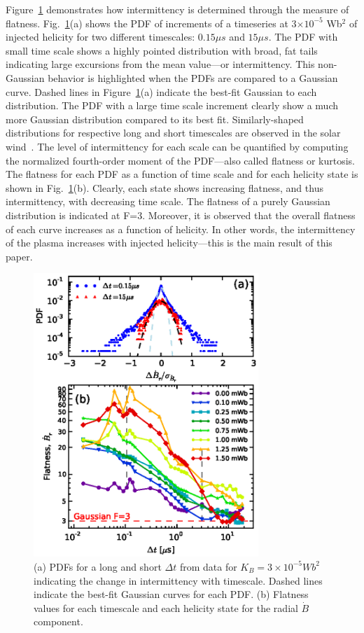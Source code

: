 \documentclass[aps,prl,amsmath,amssymb,reprint,superscriptaddress]{revtex4-1} %
\begin{document}
Figure~\ref{fig:Br_flatness} demonstrates how intermittency is determined through the measure of flatness.  Fig.~\ref{fig:Br_flatness}(a) shows the PDF of increments of a timeseries at 3$\times 10^{-5}$ Wb$^{2}$ of injected helicity for two different timescales: $0.15\mu s$ and $15\mu s$.  The PDF with small time scale shows a highly pointed distribution with broad, fat tails indicating large excursions from the mean value---or intermittency. This non-Gaussian behavior is highlighted when the PDFs are compared to a Gaussian curve. Dashed lines in Figure~\ref{fig:Br_flatness}(a) indicate the best-fit Gaussian to each distribution. The PDF with a large time scale increment clearly show a much more Gaussian distribution compared to its best fit. Similarly-shaped distributions for respective long and short timescales are observed in the solar wind~\cite{sorrisovalvo99}. The level of intermittency for each scale can be quantified by computing the normalized fourth-order moment of the PDF---also called flatness or kurtosis. The flatness for each PDF as a function of time scale and for each helicity state is shown in Fig.~\ref{fig:Br_flatness}(b). Clearly, each state shows increasing flatness, and thus intermittency, with decreasing time scale. The flatness of a purely Gaussian distribution is indicated at F=3. Moreover, it is observed that the overall flatness of each curve increases as a function of helicity. In other words, the intermittency of the plasma increases with injected helicity---this is the main result of this paper.

\begin{figure}[!htbp]
\centerline{
\includegraphics[width=8.5cm]{figure3.eps}}
\caption{\label{fig:Br_flatness} (a) PDFs for a long and short $\Delta t$ from data for $K_{B} = 3\times 10^{-5} Wb^{2}$ indicating the change in intermittency with timescale. Dashed lines indicate the best-fit Gaussian curves for each PDF. (b) Flatness values for each timescale and each helicity state for the radial $\dot{B}$ component.}
\end{figure}
\end{document}
